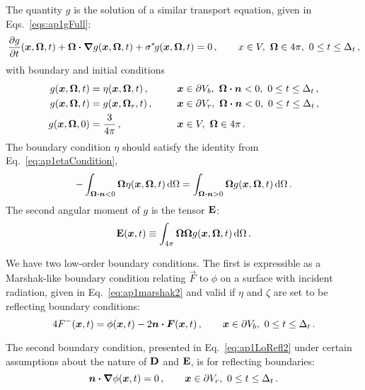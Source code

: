 The quantity $g$ is the solution of a similar transport equation, given in
Eqs.~\eqref{eqs:ap1gFull}:
\begin{equation*}
  \frac{\partial g}{\partial t}(\bm{x}, \bm{\Omega},t)
  + \bm{\Omega}\bm{\cdot} \bm{\nabla} g(\bm{x}, \bm{\Omega},t)
  + \sigma^{*\!} g(\bm{x}, \bm{\Omega},t)
  = 0 \,,
  \qquad x \in V,\ \bm{\Omega} \in 4\pi,\  0 \le t \le \Delta_t\,,
\end{equation*}
with boundary and initial conditions
\begin{alignat*}{2}
  g(\bm{x}, \bm{\Omega}, t) &= \eta(\bm{x}, \bm{\Omega}, t) \,,
 \qquad && \bm{x} \in \partial V_b, \ \bm{\Omega} \bm{\cdot} \bm{n} < 0
 ,\  0 \le t \le \Delta_t\,,
\\
  g(\bm{x}, \bm{\Omega}, t) &= g(\bm{x}, \bm{\Omega}_r, t) \,,
  && \bm{x} \in \partial V_r, \ \bm{\Omega} \bm{\cdot} \bm{n} < 0
 ,\  0 \le t \le \Delta_t\,,
\\
g(\bm{x}, \bm{\Omega}, 0) &= \frac{3}{4\pi} \,,
  && \bm{x} \in V, \ \bm{\Omega}\in 4\pi\,.
\end{alignat*}
The boundary condition $\eta$ should satisfy the identity from
Eq.~\eqref{eq:ap1etaCondition},
\begin{equation*}
- \int_{\bm{\Omega} \bm{\cdot} \bm{n} < 0}
 \bm{\Omega} \eta(\bm{x}, \bm{\Omega}, t)\mathop{}\!\mathrm{d}\Omega
 =
 \int_{\bm{\Omega} \bm{\cdot} \bm{n} > 0}
  \bm{\Omega} g(\bm{x}, \bm{\Omega}, t)\mathop{}\!\mathrm{d}\Omega \,.
\end{equation*}
The second angular moment of $g$ is the tensor $\mathbf{E}$:
\begin{equation*}
  \mathbf{E}(\bm{x},t) \equiv \int_{4\pi} \bm{\Omega} \bm{\Omega}
  g(\bm{x}, \bm{\Omega}, t) \mathop{}\!\mathrm{d}\Omega \,.
\end{equation*}

We have two low-order boundary conditions. The first is expressible as a
Marshak-like boundary condition relating $\vec{F}$ to $\phi$ on a surface with
incident radiation, given in Eq.~\eqref{eq:ap1marshak2} and valid if $\eta$ and
$\zeta$ are set to be reflecting boundary conditions:
\begin{equation*}
  4 F^-(\bm{x}, t)
  = \phi(\bm{x}, t)
  - 2 \bm{n} \bm{\cdot} \bm{F}(\bm{x}, t) \,,\qquad
   \bm{x} \in \partial V_b,\ 0 \le t \le \Delta_t \,.
\end{equation*}

The second boundary condition, presented in Eq.~\eqref{eq:ap1LoRefl2} under
certain assumptions about the nature of $\mathbf{D}$ and $\mathbf{E}$, is for reflecting
boundaries:
\begin{equation*}
  \bm{n} \bm{\cdot} \bm{\nabla} \phi(\bm{x},t) = 0\,,\qquad
   \bm{x} \in \partial V_r,\ 0 \le t \le \Delta_t \,.
\end{equation*}

